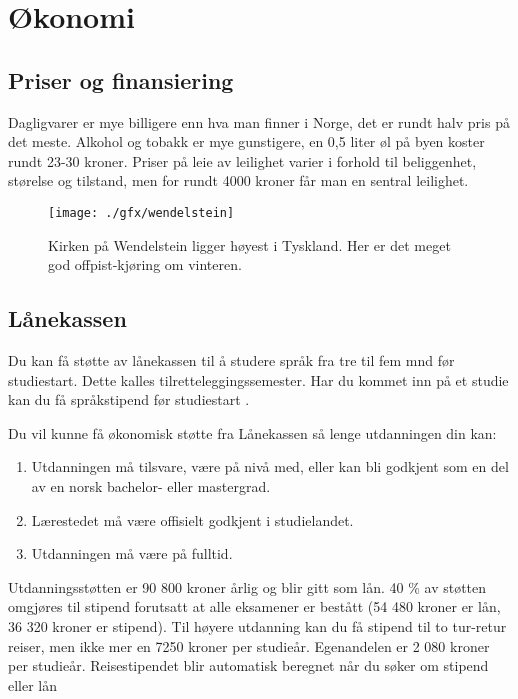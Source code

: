 \chapter{Økonomi}

\section{Priser og finansiering}
Dagligvarer er mye billigere enn hva man finner i Norge, det er rundt halv pris på det meste. Alkohol og tobakk er mye gunstigere, 
en 0,5 liter øl på byen koster rundt 23-30 kroner.
Priser på leie av leilighet varier i forhold til beliggenhet, størelse og tilstand, men for rundt 4000 kroner får man en sentral leilighet.

\begin{figure}[h]
\center
\texttt{[image: ./gfx/wendelstein]}
\caption{Kirken på Wendelstein ligger høyest i Tyskland. Her er det meget god offpist-kjøring om vinteren.}
\end{figure}

\section{Lånekassen}
Du kan få støtte av lånekassen til å studere språk fra tre til fem mnd før studiestart. Dette kalles tilretteleggingssemester. Har du kommet inn på et studie kan du få språkstipend før studiestart .


 Du vil kunne få økonomisk støtte fra Lånekassen så lenge utdanningen din kan:
 
 
\begin{enumerate}
\item Utdanningen må tilsvare, være på nivå med, eller kan bli godkjent som en del av en norsk bachelor- eller mastergrad.
\item Lærestedet må være offisielt godkjent i studielandet.
\item Utdanningen må være på fulltid.
\end{enumerate}
 
 
Utdanningsstøtten er 90 800 kroner årlig og blir gitt som lån. 40 \% av støtten omgjøres til stipend forutsatt at alle eksamener er bestått (54 480 kroner er lån, 36 320 kroner er stipend).
Til høyere utdanning kan du få stipend til to tur-retur reiser, men ikke mer en 7250 kroner per studieår. Egenandelen er 2 080 kroner per studieår. 
Reisestipendet blir automatisk beregnet når du søker om stipend eller lån



